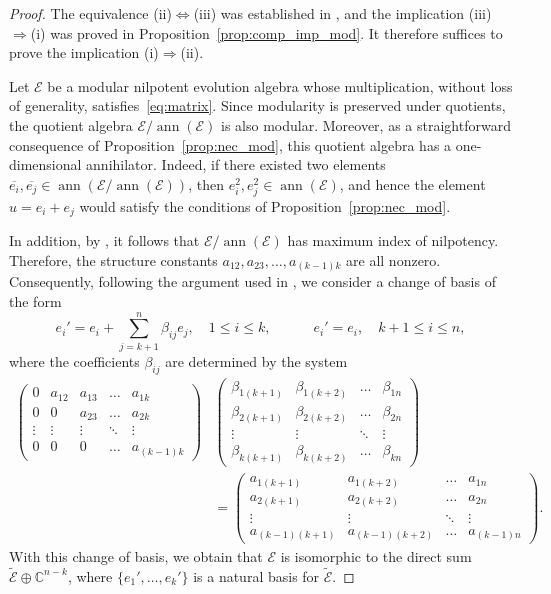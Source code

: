 \documentclass[12pt,reqno]{amsart}
\theoremstyle{plain}%
\theoremstyle{definition}
\theoremstyle{remark}
\newcommand{\E}{\mathcal{E}}
\DeclareMathOperator{\ann}{ann}
\numberwithin{equation}{section}
\begin{document}
\begin{proof}
 	The equivalence (ii)$\Leftrightarrow$(iii) was established in \cite[Theorem~4.2]{CKO_19}, and the implication (iii)$\Rightarrow$(i) was proved in Proposition~\ref{prop:comp_imp_mod}. It therefore suffices to prove the implication (i)$\Rightarrow$(ii).
	
	Let $\E$ be a modular nilpotent evolution algebra whose multiplication, without loss of generality, satisfies~\eqref{eq:matrix}.
	Since modularity is preserved under quotients, the quotient algebra $\E/\ann(\E)$ is also modular. Moreover, as a straightforward consequence of Proposition~\ref{prop:nec_mod}, this quotient algebra has a one-dimensional annihilator. Indeed, if there existed two elements $\overline{e_i},\overline{e_j}\in\ann(\E/\ann(\E))$, then  $e_i^2,e_j^2\in\ann(\E)$, and hence the element $u=e_i+e_j$ would satisfy the conditions of Proposition~\ref{prop:nec_mod}. 
	
	In addition, by
	\cite[Theorem~5.1 \& Corollary~5.7]{LPP_25}, it follows that $\E/\ann(\E)$ has maximum index of nilpotency.  Therefore, the structure constants $a_{12},a_{23},\dots,a_{(k-1)k}$ are all nonzero. 
	Consequently, following the argument used in \cite[p.~294]{CKO_19}, we consider a change of basis of the form \[e_i'=e_i+\sum_{j=k+1}^{n}\beta_{ij}e_j,\quad1\leq i\leq k,\qquad\quad e_i'=e_i,\quad k+1\leq i\leq n,\] where the coefficients $\beta_{ij}$ are determined by the system
	\begin{align*}
		\left(
		\begin{matrix}
			0 & a_{12} & a_{13} & \dots & a_{1k} \\
			0 & 0 & a_{23} & \dots & a_{2k} \\
			\vdots & \vdots & \vdots & \ddots & \vdots \\
			0 & 0 & 0 & \dots & a_{(k-1)k}
		\end{matrix}
		\right)&
		\left(
		\begin{matrix}
			\beta_{1(k+1)} & \beta_{1(k+2)} & \dots & \beta_{1n} \\
			\beta_{2(k+1)} & \beta_{2(k+2)} & \dots & \beta_{2n} \\
			\vdots & \vdots & \ddots & \vdots \\
			\beta_{k(k+1)} & \beta_{k(k+2)} & \dots & \beta_{kn}
		\end{matrix}
		\right)
		\\&=
		\left(
		\begin{matrix}
			a_{1(k+1)} & a_{1(k+2)} & \dots & a_{1n} \\
			a_{2(k+1)} & a_{2(k+2)} & \dots & a_{2n} \\
			\vdots & \vdots & \ddots & \vdots \\
			a_{(k-1)(k+1)} & a_{(k-1)(k+2)} & \dots & a_{(k-1)n}
		\end{matrix}
		\right).
	\end{align*}
	With this change of basis, we obtain that $\E$ is isomorphic to the direct sum $\widetilde{\E}\oplus\mathbb{C}^{n-k}$, where $\{e_1',\dots,e_k'\}$ is a natural basis for $\widetilde{\E}$.
\end{proof}
\end{document}
